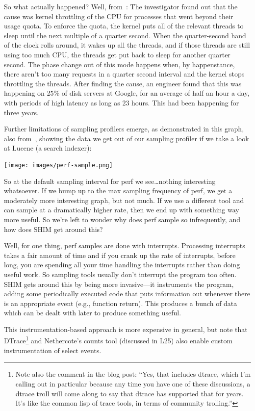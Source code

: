 \documentclass[a4paper]{report}
\begin{document}
So what actually happened? Well, from~\cite{perf-tracing}: The investigator found out that the cause was kernel throttling of the CPU for processes that went beyond their usage quota. To enforce the quota, the kernel puts all of the relevant threads to sleep until the next multiple of a quarter second. When the quarter-second hand of the clock rolls around, it wakes up all the threads, and if those threads are still using too much CPU, the threads get put back to sleep for another quarter second. The phase change out of this mode happens when, by happenstance, there aren't too many requests in a quarter second interval and the kernel stops throttling the threads. After finding the cause, an engineer found that this was happening on 25\% of disk servers at Google, for an average of half an hour a day, with periods of high latency as long as 23 hours. This had been happening for three years.

Further limitations of sampling profilers emerge, as demonstrated in this graph, also from~\cite{perf-tracing}, showing the data we get out of our sampling profiler if we take a look at Lucene (a search indexer):

\begin{center}
	\texttt{[image: images/perf-sample.png]}
\end{center}

So at the default sampling interval for perf we see\ldots nothing interesting whatsoever. If we bump up to the max sampling frequency of perf, we get a moderately more interesting graph, but not much. If we use a different tool and can sample at a dramatically higher rate, then we end up with something way more useful. So we're left to wonder why does perf sample so infrequently, and how does SHIM get around this?

Well, for one thing, perf samples are done with interrupts. Processing interrupts takes a fair amount of time and if you crank up the rate of interrupts, before long, you are spending all your time handling the interrupts rather than doing useful work. So sampling tools usually don't interrupt the program too often. SHIM gets around this by being more invasive---it instruments the program, adding some periodically executed code that puts information out whenever there is an appropriate event (e.g., function return). This produces a bunch of data which can be dealt with later to produce something useful.

This instrumentation-based approach is more expensive in general, but note that DTrace\footnote{Note also the comment in the blog post: ``Yes, that includes dtrace, which I'm calling out in particular because any time you have one of these discussions, a dtrace troll will come along to say that dtrace has supported that for years. It's like the common lisp of trace tools, in terms of community trolling.''} and Nethercote's counts tool (discussed in L25) also enable custom instrumentation of select events. 
\end{document}

